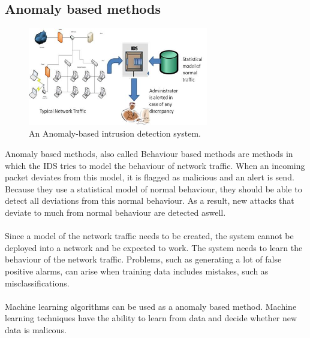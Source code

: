 \subsection{Anomaly based methods}
\begin{figure}[H]
\centering
\includegraphics[width=0.7\textwidth]{Figures/Anomaly-based-Intrusion-Detection-System}
\decoRule
\caption[Anomaly based IDS]{An Anomaly-based intrusion detection system.}
\label{fig:Anomaly}
\end{figure}
\noindent Anomaly based methods, also called Behaviour based methods are methods in which the IDS tries to model the behaviour of network traffic. When an incoming packet deviates from this model, it is flagged as malicious and an alert is send. Because they use a statistical model of normal behaviour, they should be able to detect all deviations from this normal behaviour. As a result, new attacks that deviate to much from normal behaviour are detected aswell. \\
\\
Since a model of the network traffic needs to be created, the system cannot be deployed into a network and be expected to work. The system needs to learn the behaviour of the network traffic. Problems, such as generating a lot of false positive alarms, can arise when training data includes mistakes, such as misclassifications. \\
\\
Machine learning algorithms can be used as a anomaly based method. Machine learning techniques have the ability to learn from data and decide whether new data is malicous. 